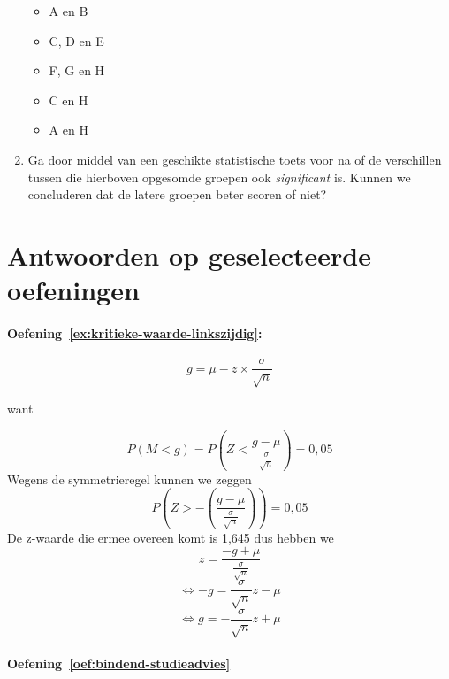 \begin{exercise}
\begin{enumerate}
    \begin{itemize}
      \item A en B
      \item C, D en E
      \item F, G en H
      \item C en H
      \item A en H
    \end{itemize}
  
    \item Ga door middel van een geschikte statistische toets voor na of de verschillen tussen die hierboven opgesomde groepen ook \emph{significant} is. Kunnen we concluderen dat de latere groepen beter scoren of niet?
  \end{enumerate}
\end{exercise}

\section{Antwoorden op geselecteerde oefeningen}
\label{sec:toetsingsprocedures-antwoorden}

\paragraph{Oefening~\ref{ex:kritieke-waarde-linkszijdig}:}

\begin{equation}
g = \mu - z \times \frac{\sigma}{\sqrt{n}}
\label{eq:kritiekeRechtseWaarde2}
\end{equation}

want

\[ P(M < g) = P\left(Z < \frac{g - \mu}{\frac{\sigma}{\sqrt{n}}}\right) = 0,05 \]
Wegens de symmetrieregel kunnen we zeggen
\[ P\left(Z > - \left( \frac{g - \mu}{\frac{\sigma}{\sqrt{n}}} \right) \right) = 0,05 \]
De z-waarde die ermee overeen komt is 1,645 dus hebben we
\[ z = \frac{-g + \mu}{\frac{\sigma}{\sqrt{n}}} \]
\[ \Leftrightarrow -g = \frac{\sigma}{\sqrt{n}} z - \mu \]
\[ \Leftrightarrow g = -\frac{\sigma}{\sqrt{n}} z + \mu \]

\paragraph{Oefening~\ref{oef:bindend-studieadvies}}


